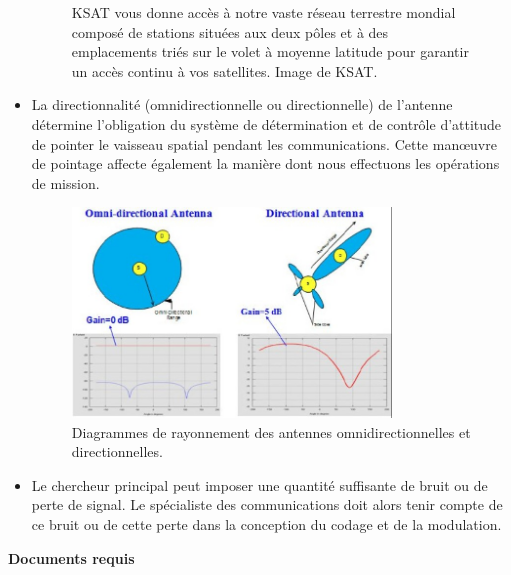 \begin{itemize}
\begin{figure}[H]
    \caption{KSAT vous donne accès à notre vaste réseau terrestre mondial composé de stations situées aux deux pôles et à des emplacements triés sur le volet à moyenne latitude pour garantir un accès continu à vos satellites. Image de KSAT.}
    \label{fig:communication2}
\end{figure}
\item La directionnalité (omnidirectionnelle ou directionnelle) de l'antenne détermine l'obligation du système de détermination et de contrôle d'attitude de pointer le vaisseau spatial pendant les communications. Cette manœuvre de pointage affecte également la manière dont nous effectuons les opérations de mission.
\begin{figure}[H] %
    \centering
    \includegraphics[width=0.8\textwidth]{figures/6-8.jpg}
    \caption{Diagrammes de rayonnement des antennes omnidirectionnelles et directionnelles.}
    \label{fig:communication2}
\end{figure}
\item Le chercheur principal peut imposer une quantité suffisante de bruit ou de perte de signal. Le spécialiste des communications doit alors tenir compte de ce bruit ou de cette perte dans la conception du codage et de la modulation.
\end{itemize}
\textbf{Documents requis}
